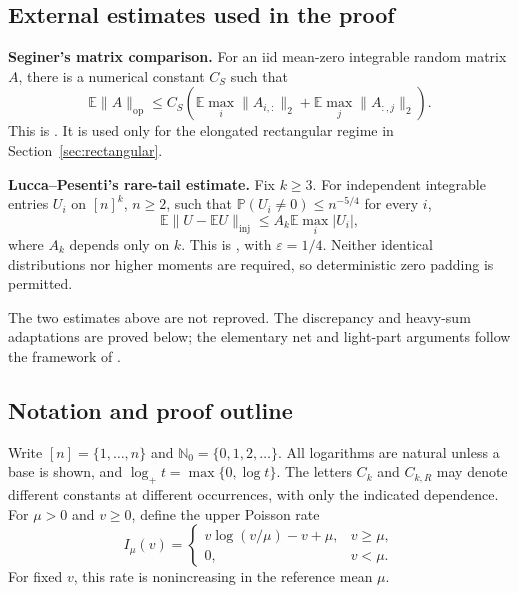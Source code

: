 \documentclass[11pt]{article}
\theoremstyle{spaced}
\theoremstyle{remark}
\numberwithin{equation}{section}
\newcommand{\E}{\mathbb E}
\newcommand{\Pp}{\mathbb P}
\newcommand{\inj}{\mathrm{inj}}
\newcommand{\NN}{\mathbb N_0}
\newcommand{\step}[1]{\par\addvspace{0.5\baselineskip}\noindent\textbf{#1}\enspace}
\begin{document}
\subsection{External estimates used in the proof}\label{sec:inputs}

\step{Seginer's matrix comparison.}
For an iid mean-zero integrable random matrix $A$, there is a numerical
constant $C_S$ such that
\begin{equation}\label{eq:seginer-input}
 \E\|A\|_{\mathrm{op}}
 \le C_S\left(
 \E\max_i\|A_{i,:}\|_2+\E\max_j\|A_{:,j}\|_2\right).
\end{equation}
This is \cite[Corollary~2.2, with moment exponent one]{Seg}. It is used
only for the elongated rectangular regime in
Section~\ref{sec:rectangular}.

\step{Lucca--Pesenti's rare-tail estimate.}
Fix $k\ge3$. For independent integrable entries $U_i$ on $[n]^k$,
$n\ge2$, such that $\Pp(U_i\ne0)\le n^{-5/4}$ for every $i$,
\begin{equation}\label{eq:LP-input}
 \E\|U-\E U\|_{\inj}\le A_k\E\max_i|U_i|,
\end{equation}
where $A_k$ depends only on $k$. This is
\cite[Theorem~1.4 and Corollary~4.3]{LP}, with
$\varepsilon=1/4$. Neither identical distributions nor higher moments
are required, so deterministic zero padding is permitted.

The two estimates above are not reproved. The discrepancy and heavy-sum
adaptations are proved below; the elementary net and light-part
arguments follow the framework of \cite[Lemmas~4.1--4.2]{ZZ}.

\subsection{Notation and proof outline}

Write $[n]=\{1,\ldots,n\}$ and $\NN=\{0,1,2,\ldots\}$.
All logarithms are natural unless a base is shown, and
$\log_+t=\max\{0,\log t\}$. The letters $C_k$ and $C_{k,R}$ may
denote different constants at different occurrences, with only the
indicated dependence. For $\mu>0$ and $v\ge0$, define the upper
Poisson rate
\begin{equation}\label{eq:rate-definition}
 I_\mu(v)=
 \begin{cases}
 v\log(v/\mu)-v+\mu,&v\ge\mu,\\
 0,&v<\mu.
 \end{cases}
\end{equation}
For fixed $v$, this rate is nonincreasing in the reference mean $\mu$.
\end{document}

